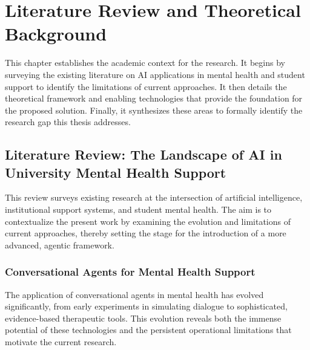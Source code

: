\chapter{Literature Review and Theoretical Background}

This chapter establishes the academic context for the research. It begins by surveying the existing literature on AI applications in mental health and student support to identify the limitations of current approaches. It then details the theoretical framework and enabling technologies that provide the foundation for the proposed solution. Finally, it synthesizes these areas to formally identify the research gap this thesis addresses.


\section{Literature Review: The Landscape of AI in University Mental Health Support}
\label{sec:literature_review}

This review surveys existing research at the intersection of artificial intelligence, institutional support systems, and student mental health. The aim is to contextualize the present work by examining the evolution and limitations of current approaches, thereby setting the stage for the introduction of a more advanced, agentic framework.

\subsection{Conversational Agents for Mental Health Support}

The application of conversational agents in mental health has evolved significantly, from early experiments in simulating dialogue to sophisticated, evidence-based therapeutic tools. This evolution reveals both the immense potential of these technologies and the persistent operational limitations that motivate the current research.

